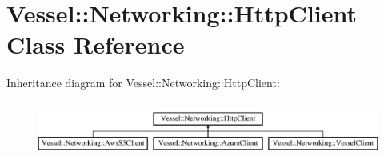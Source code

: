 \hypertarget{class_vessel_1_1_networking_1_1_http_client}{}\section{Vessel\+:\+:Networking\+:\+:Http\+Client Class Reference}
\label{class_vessel_1_1_networking_1_1_http_client}
Inheritance diagram for Vessel\+:\+:Networking\+:\+:Http\+Client\+:\begin{figure}[H]
\begin{center}
\leavevmode
\includegraphics[height=1.830065cm]{class_vessel_1_1_networking_1_1_http_client}
\end{center}
\end{figure}
